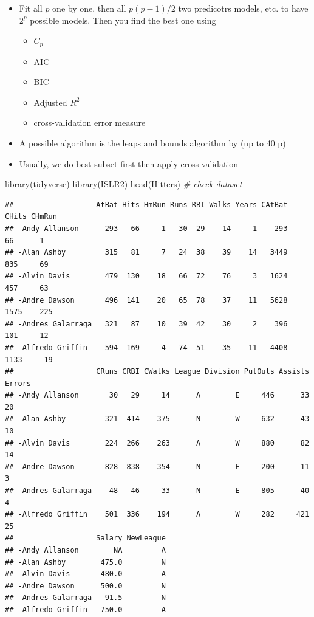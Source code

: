 \documentclass[
]{book}
\newenvironment{Shaded}{\begin{snugshade}}{\end{snugshade}}
\newcommand{\CommentTok}[1]{\textcolor[rgb]{0.56,0.35,0.01}{\textit{#1}}}
\newcommand{\FunctionTok}[1]{\textcolor[rgb]{0.00,0.00,0.00}{#1}}
\newcommand{\NormalTok}[1]{#1}
\begin{document}
\begin{itemize}
\item
  Fit all \(p\) one by one, then all \(p(p-1)/2\) two predicotrs models, etc. to have \(2^p\) possible models. Then you find the best one using

  \begin{itemize}
  \item
    \(C_p\)
  \item
    AIC
  \item
    BIC
  \item
    Adjusted \(R^2\)
  \item
    cross-validation error measure
  \end{itemize}
\item
  A possible algorithm is the leaps and bounds algorithm by \citet{furnival1974} (up to 40 p)
\item
  Usually, we do best-subset first then apply cross-validation
\end{itemize}

\begin{Shaded}
\begin{Highlighting}[]
\FunctionTok{library}\NormalTok{(tidyverse)}
\FunctionTok{library}\NormalTok{(ISLR2)}
\FunctionTok{head}\NormalTok{(Hitters) }\CommentTok{\# check dataset }
\end{Highlighting}
\end{Shaded}

\begin{verbatim}
##                   AtBat Hits HmRun Runs RBI Walks Years CAtBat CHits CHmRun
## -Andy Allanson      293   66     1   30  29    14     1    293    66      1
## -Alan Ashby         315   81     7   24  38    39    14   3449   835     69
## -Alvin Davis        479  130    18   66  72    76     3   1624   457     63
## -Andre Dawson       496  141    20   65  78    37    11   5628  1575    225
## -Andres Galarraga   321   87    10   39  42    30     2    396   101     12
## -Alfredo Griffin    594  169     4   74  51    35    11   4408  1133     19
##                   CRuns CRBI CWalks League Division PutOuts Assists Errors
## -Andy Allanson       30   29     14      A        E     446      33     20
## -Alan Ashby         321  414    375      N        W     632      43     10
## -Alvin Davis        224  266    263      A        W     880      82     14
## -Andre Dawson       828  838    354      N        E     200      11      3
## -Andres Galarraga    48   46     33      N        E     805      40      4
## -Alfredo Griffin    501  336    194      A        W     282     421     25
##                   Salary NewLeague
## -Andy Allanson        NA         A
## -Alan Ashby        475.0         N
## -Alvin Davis       480.0         A
## -Andre Dawson      500.0         N
## -Andres Galarraga   91.5         N
## -Alfredo Griffin   750.0         A
\end{verbatim}
\end{document}
